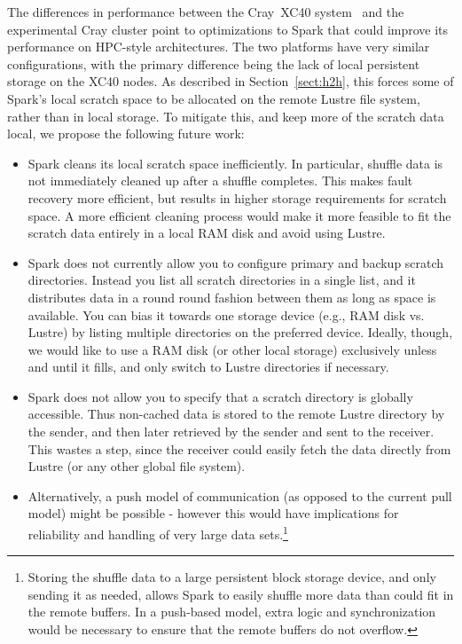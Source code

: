 The differences in performance between the Cray{\textsuperscript{\tiny\textregistered}}~XC40{\textsuperscript{\tiny\texttrademark}} system~\cite{alverson2012cray,craycascadesc12} and the experimental Cray cluster point to optimizations to Spark that could improve its performance on HPC-style architectures.  The two platforms have very similar configurations, with the primary difference being the lack of local persistent storage on the XC40 nodes.  As described in Section~\ref{sect:h2h}, this forces some of Spark's local scratch space to be allocated on the remote Lustre file system, rather than in local storage.  To mitigate this, and keep more of the scratch data local, we propose the following future work:
\begin{itemize}
  \item Spark cleans its local scratch space inefficiently.
  In particular, shuffle data is not immediately cleaned up after a shuffle
  completes. This makes fault recovery more efficient, but results in higher
  storage requirements for scratch space. A more efficient cleaning process would
  make it more feasible to fit the scratch data entirely in a local RAM disk and
  avoid using Lustre.
\item Spark does not currently allow you to configure primary and backup
  scratch directories.  Instead you list all scratch directories in a single
  list, and it distributes data in a round round fashion between them as long
  as space is available.  You can bias it towards one storage device (e.g., RAM
  disk vs. Lustre) by listing multiple directories on the preferred device.
  Ideally, though, we would like to use a RAM disk (or other local storage)
  exclusively unless and until it fills, and only switch to Lustre directories
  if necessary.
\item Spark does not allow you to specify that a scratch directory is globally
  accessible.  Thus non-cached data is stored to the remote Lustre directory by
  the sender, and then later retrieved by the sender and sent to the receiver.
  This wastes a step, since the receiver could easily fetch the data directly
  from Lustre (or any other global file system).
\item Alternatively, a push model of communication (as opposed to the current
  pull model) might be possible - however this would have implications for
  reliability and handling of very large data sets.\footnote{Storing the
    shuffle data to a large persistent block storage device, and only sending
    it as needed, allows Spark to easily shuffle more data than could fit in
    the remote buffers.  In a push-based model, extra logic and synchronization
    would be necessary to ensure that the remote buffers do not overflow.}
\end{itemize}
